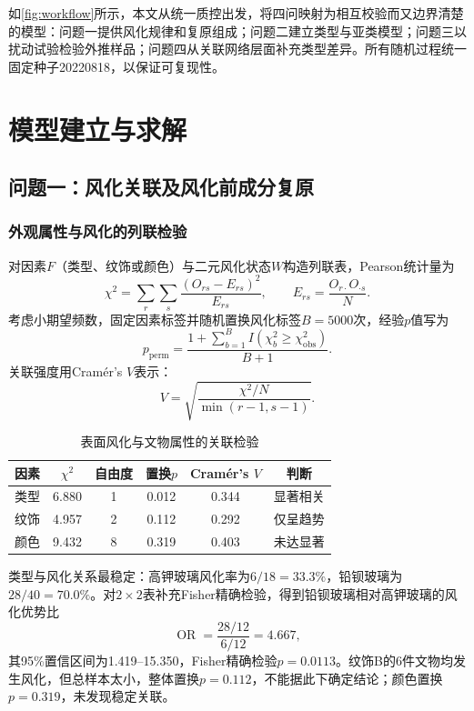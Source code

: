 \documentclass[UTF8,a4paper,zihao=-4,fontset=windows]{ctexart}
\begin{document}
如\cref{fig:workflow}所示，本文从统一质控出发，将四问映射为相互校验而又边界清楚的模型：问题一提供风化规律和复原组成；问题二建立类型与亚类模型；问题三以扰动试验检验外推样品；问题四从关联网络层面补充类型差异。所有随机过程统一固定种子20220818，以保证可复现性。

\section{模型建立与求解}

\subsection{问题一：风化关联及风化前成分复原}

\subsubsection{外观属性与风化的列联检验}

对因素$F$（类型、纹饰或颜色）与二元风化状态$W$构造列联表，Pearson统计量为
\begin{equation}
  \chi^2=\sum_{r}\sum_{s}\frac{(O_{rs}-E_{rs})^2}{E_{rs}},
  \qquad E_{rs}=\frac{O_{r\cdot}O_{\cdot s}}{N}.
  \label{eq:chi2}
\end{equation}
考虑小期望频数，固定因素标签并随机置换风化标签$B=5000$次，经验$p$值写为
\begin{equation}
  p_{\mathrm{perm}}=\frac{1+\sum_{b=1}^{B}I(\chi_b^2\geq\chi_{\mathrm{obs}}^2)}{B+1}.
  \label{eq:permp}
\end{equation}
关联强度用Cram\'{e}r's $V$表示：
\begin{equation}
  V=\sqrt{\frac{\chi^2/N}{\min(r-1,s-1)}}.
\end{equation}

\begin{table}[htbp]
\centering
\caption{表面风化与文物属性的关联检验}
\label{tab:association}
\begin{tabular}{lccccc}
\toprule
因素 & $\chi^2$ & 自由度 & 置换$p$ & Cram\'{e}r's $V$ & 判断 \\
\midrule
类型 & 6.880 & 1 & 0.012 & 0.344 & 显著相关 \\
纹饰 & 4.957 & 2 & 0.112 & 0.292 & 仅呈趋势 \\
颜色 & 9.432 & 8 & 0.319 & 0.403 & 未达显著 \\
\bottomrule
\end{tabular}
\end{table}

类型与风化关系最稳定：高钾玻璃风化率为$6/18=33.3\%$，铅钡玻璃为$28/40=70.0\%$。对$2\times2$表补充Fisher精确检验，得到铅钡玻璃相对高钾玻璃的风化优势比
\begin{equation}
  \operatorname{OR}=\frac{28/12}{6/12}=4.667,
\end{equation}
其95\%置信区间为1.419--15.350，Fisher精确检验$p=0.0113$。纹饰B的6件文物均发生风化，但总样本太小，整体置换$p=0.112$，不能据此下确定结论；颜色置换$p=0.319$，未发现稳定关联。
\end{document}
